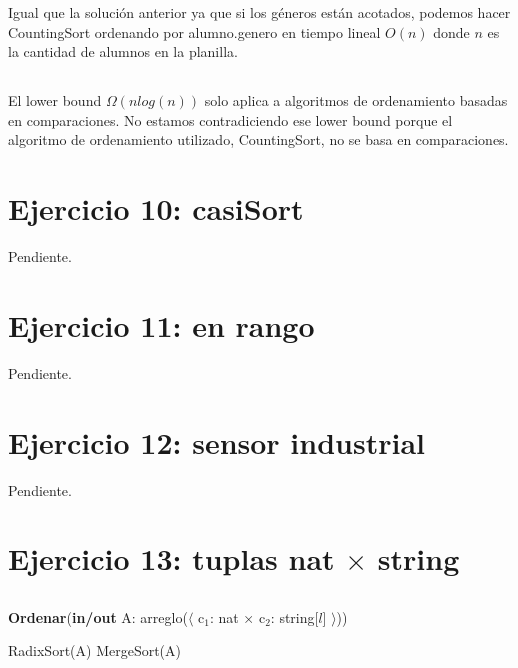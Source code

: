 Igual que la solución anterior ya que si los géneros están acotados, podemos hacer CountingSort ordenando por alumno.genero en tiempo lineal $O(n)$ donde $n$ es la cantidad de alumnos en la planilla.

\subsection{}

El lower bound $\Omega(n log(n))$ solo aplica a algoritmos de ordenamiento basadas en comparaciones. No estamos contradiciendo ese lower bound porque el algoritmo de ordenamiento utilizado, CountingSort, no se basa en comparaciones.

\section{Ejercicio 10: casiSort}

Pendiente.

\section{Ejercicio 11: en rango}

Pendiente.

\section{Ejercicio 12: sensor industrial}

Pendiente.

\section{Ejercicio 13: tuplas nat $\times$ string}

\subsection{}

\begin{algorithm}[H]
\caption{
    \textbf{Ordenar}(\textbf{in/out} A: arreglo($\langle$ c$_1$: nat × c$_2$: string[$l$] $\rangle$))
}
\begin{algorithmic}[1]
    \State RadixSort(A) 
    \State MergeSort(A) 
\end{algorithmic}
\end{algorithm}

